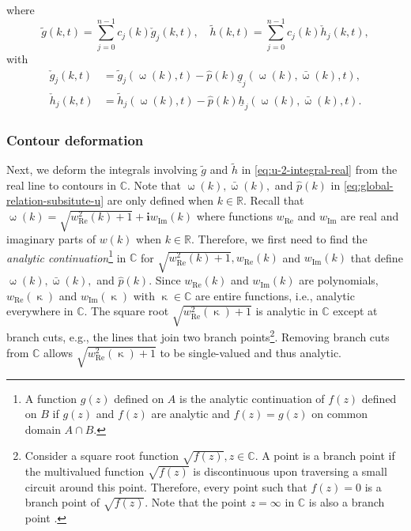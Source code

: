 \documentclass[journal,twoside,web]{ieeecolor}
\newcommand{\RR}{\mathbb{R}}
\newcommand{\CC}{\mathbb{C}}
\newcommand{\im}{\mathbf{i}}
\newcommand{\wcomplex}{\upomega}
\newcommand{\kcomplex}{\upkappa}
\begin{document}
where 
$$\tilde{g}(k,t)=\sum_{j=0}^{n-1}c_j(k)\check{g}_j(k,t),\quad
\tilde{h}(k,t)=\sum_{j=0}^{n-1}c_j(k)\check{h}_j(k,t),$$
with
\begin{equation}\label{eq:check-g-h}
	\begin{aligned}
		\check{g}_j(k,t) &= \tilde{g}_j(\wcomplex(k),t) -\hat{p}(k)\underline{g}_j(\wcomplex(k),\bar{\wcomplex}(k),t),\\
		\check{h}_j(k,t) &= \tilde{h}_j(\wcomplex(k),t) -\hat{p}(k)\underline{h}_j(\wcomplex(k),\bar{\wcomplex}(k),t).
	\end{aligned}
\end{equation}

\subsubsection{Contour deformation}
\label{sec:contour-deformation}

Next, we deform the integrals involving $\tilde{g}$ and $\tilde{h}$ in \eqref{eq:u-2-integral-real} from the real line to contours in $\CC$.
Note that $\wcomplex(k),\bar{\wcomplex}(k),$ and $\hat{p}(k)$ in \eqref{eq:global-relation-subsitute-u} are only defined when $k\in\RR$.
Recall that $\wcomplex(k)= \sqrt{w_{\text{Re}}^2(k) + 1} + \im w_{\text{Im}}(k)$ where functions $w_{\text{Re}}$ and $w_{\text{Im}}$ are real and imaginary parts of $w(k)$ when $k\in\RR$. 
Therefore, we first need to find the \emph{analytic continuation}\footnote{A function $g(z)$ defined on $A$ is the analytic continuation of $f(z)$ defined on $B$ if $g(z)$ and $f(z)$ are analytic and $f(z)=g(z)$ on common domain $A\cap B$.} in $\CC$ for $\sqrt{w_{\text{Re}}^2(k) + 1}, w_{\text{Re}}(k)$ and $w_{\text{Im}}(k)$ that define $\wcomplex(k),\bar{\wcomplex}(k),$ and $\hat{p}(k)$.
Since $w_{\text{Re}}(k)$ and $w_{\text{Im}}(k)$ are polynomials, $w_{\text{Re}}(\kcomplex)$ and $w_{\text{Im}}(\kcomplex)$ with $\kcomplex\in\CC$ are entire functions, i.e., analytic everywhere in $\CC$.
The square root $\sqrt{w_{\text{Re}}^2(\kcomplex) + 1}$ is analytic in $\CC$ except at branch cuts, e.g., the lines that join two branch points\footnote{Consider a square root function $\sqrt{f(z)},z\in\CC$. 
A point is a branch point if the multivalued function $\sqrt{f(z)}$ is discontinuous upon traversing a small circuit around this point.
Therefore, every point such that $f(z)=0$ is a branch point of $\sqrt{f(z)}$. Note that the point $z=\infty$ in $\CC$ is also a branch point \cite{ablowitz2003complex}.}.
Removing branch cuts from $\CC$ allows $\sqrt{w_{\text{Re}}^2(\kcomplex) + 1}$ to be single-valued and thus analytic. 
\end{document}
